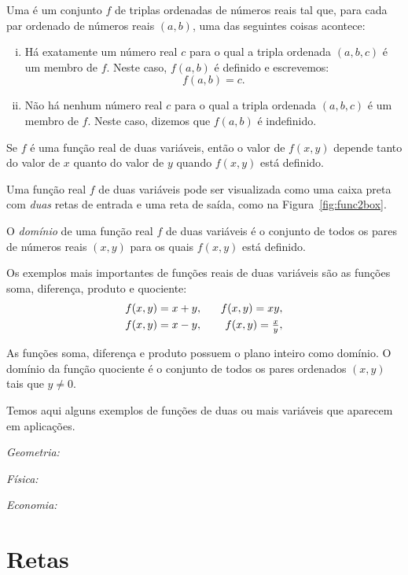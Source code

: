 \documentclass{svmono}
\begin{document}
\begin{defin}
Uma  é um conjunto $f$ de
triplas ordenadas de números reais tal que, para cada par ordenado
de números reais $(a,b)$, uma das seguintes coisas acontece:
\begin{enumerate}[(i)]
\item Há exatamente um número real $c$ para o qual a tripla
      ordenada $(a,b,c)$ é um membro de $f$. Neste caso, $f(a,b)$
      é definido e escrevemos:
\[
  f(a,b) = c.
\]
\item Não há nenhum número real $c$ para o qual a tripla
      ordenada $(a,b,c)$ é um membro de $f$. Neste caso,
      dizemos que $f(a,b)$ é indefinido.
\end{enumerate}
\end{defin}

Se $f$ é uma função real de duas variáveis, então o valor
de $f(x,y)$ depende tanto do valor de $x$ quanto do valor
de $y$ quando $f(x,y)$ está definido.

Uma função real $f$ de duas variáveis pode ser visualizada
como uma caixa preta com \emph{duas} retas de entrada e uma
reta de saída, como na Figura~\ref{fig:func2box}.


O \emph{domínio} de uma função real $f$ de duas variáveis é
o conjunto de todos os pares de números reais $(x,y)$ para os
quais $f(x,y)$ está definido.

Os exemplos mais importantes de funções reais de duas variáveis
são as funções soma, diferença, produto e quociente:
\begin{eqnarray*}
  f(x,y) = x+y, & \hspace{2ex} & f(x,y) = xy, \\
  f(x,y) = x-y, & \hspace{2ex} & \textstyle f(x,y) = \frac{x}{y},
\end{eqnarray*}

As funções soma, diferença e produto possuem o plano inteiro
como domínio. O domínio da função quociente é o conjunto de
todos os pares ordenados $(x,y)$ tais que $y \ne 0$.

Temos aqui alguns exemplos de funções de duas ou mais variáveis
que aparecem em aplicações.

\emph{Geometria:}

\emph{Física:}

\emph{Economia:}

\sectionproblems

\section{Retas}
\label{sec:lines}
\end{document}

